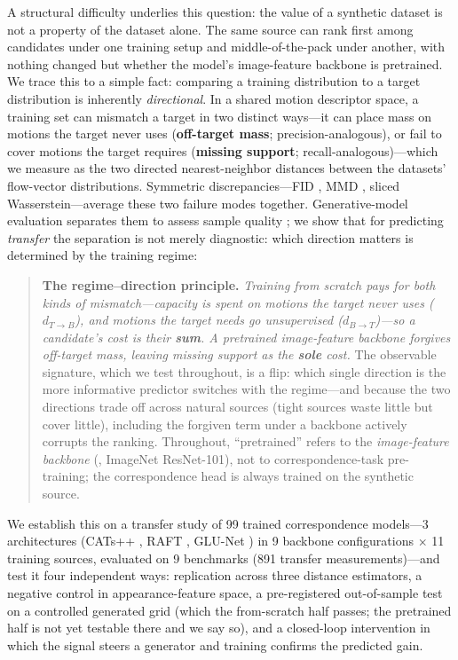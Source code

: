 \documentclass[runningheads]{llncs}
\newcommand{\dtb}{d_{T\to B}}
\newcommand{\dbt}{d_{B\to T}}
\begin{document}
A structural difficulty underlies this question: the value of a synthetic
dataset is not a property of the dataset alone. The same source can rank first
among candidates under one training setup and middle-of-the-pack under another,
with nothing changed but whether the model's image-feature backbone is
pretrained. We trace this to a simple fact: comparing a training distribution
to a target distribution is inherently \emph{directional}. In a shared motion
descriptor space, a training set can mismatch a target in two distinct ways---it
can place mass on motions the target never uses (\textbf{off-target mass};
precision-analogous), or fail to cover motions the target requires
(\textbf{missing support}; recall-analogous)---which we measure as the two
directed nearest-neighbor distances between the datasets' flow-vector
distributions. Symmetric discrepancies---FID
\cite{heusel2018ganstrainedtimescaleupdate}, MMD
\cite{gretton2008kernelmethodtwosampleproblem}, sliced Wasserstein---average
these two failure modes together. Generative-model evaluation separates them to
assess sample quality \cite{sajjadi2018assessing_precision_recall,kynkaanniemi2019improved_pr};
we show that for predicting \emph{transfer} the separation is not merely
diagnostic: which direction matters is determined by the training regime:

\begin{quote}
\textbf{The regime--direction principle.} \emph{Training from scratch pays
for both kinds of mismatch---capacity is spent on motions the target never
uses ($\dtb$), and motions the target needs go unsupervised ($\dbt$)---so a
candidate's cost is their \textbf{sum}. A pretrained image-feature backbone
forgives off-target mass, leaving missing support as the \textbf{sole}
cost.} The observable signature, which we test throughout, is a flip: which
single direction is the more informative predictor switches with the
regime---and because the two directions trade off across natural sources
(tight sources waste little but cover little), including the forgiven term
under a backbone actively corrupts the ranking. Throughout, ``pretrained''
refers to the \emph{image-feature backbone} (\eg, ImageNet ResNet-101), not
to correspondence-task pre-training; the correspondence head is always
trained on the synthetic source.
\end{quote}

We establish this on a transfer study of 99 trained correspondence
models---3 architectures (CATs++ \cite{cho2022cats++}, RAFT
\cite{teed2020raft}, GLU-Net \cite{truong2020glunet}) in 9 backbone
configurations $\times$ 11 training sources, evaluated on 9 benchmarks
(891 transfer measurements)---and test
it four independent ways: replication across three distance estimators, a
negative control in appearance-feature space, a pre-registered out-of-sample
test on a controlled generated grid (which the from-scratch half passes; the
pretrained half is not yet testable there and we say so), and a closed-loop
intervention in which the signal steers a generator and training confirms the
predicted gain.
\end{document}
